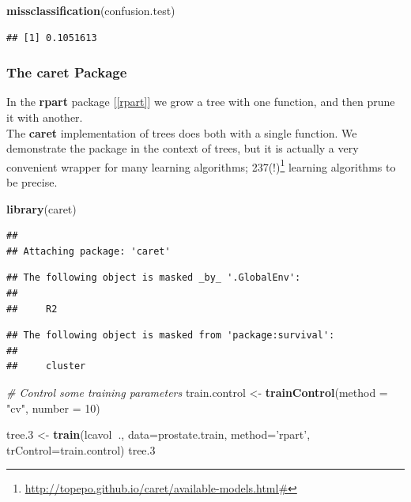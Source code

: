 \documentclass[]{book}
\newenvironment{Shaded}{\begin{snugshade}}{\end{snugshade}}
\newcommand{\CommentTok}[1]{\textcolor[rgb]{0.56,0.35,0.01}{\textit{#1}}}
\newcommand{\DataTypeTok}[1]{\textcolor[rgb]{0.13,0.29,0.53}{#1}}
\newcommand{\DecValTok}[1]{\textcolor[rgb]{0.00,0.00,0.81}{#1}}
\newcommand{\FloatTok}[1]{\textcolor[rgb]{0.00,0.00,0.81}{#1}}
\newcommand{\KeywordTok}[1]{\textcolor[rgb]{0.13,0.29,0.53}{\textbf{#1}}}
\newcommand{\NormalTok}[1]{#1}
\newcommand{\OperatorTok}[1]{\textcolor[rgb]{0.81,0.36,0.00}{\textbf{#1}}}
\newcommand{\StringTok}[1]{\textcolor[rgb]{0.31,0.60,0.02}{#1}}
\renewcommand{\href}[2]{#2\footnote{\url{#1}}}
\theoremstyle{definition}
\theoremstyle{definition}
\theoremstyle{definition}
\theoremstyle{remark}
\begin{document}
\begin{Shaded}
\begin{Highlighting}[]
\KeywordTok{missclassification}\NormalTok{(confusion.test)}
\end{Highlighting}
\end{Shaded}

\begin{verbatim}
## [1] 0.1051613
\end{verbatim}

\hypertarget{caret}{%
\subsubsection{The caret Package}\label{caret}}

In the \textbf{rpart} package {[}\ref{rpart}{]} we grow a tree with one function, and then prune it with another.\\
The \textbf{caret} implementation of trees does both with a single function.
We demonstrate the package in the context of trees, but it is actually a very convenient wrapper for many learning algorithms; \href{http://topepo.github.io/caret/available-models.html\#}{237(!)}
learning algorithms to be precise.

\begin{Shaded}
\begin{Highlighting}[]
\KeywordTok{library}\NormalTok{(caret)}
\end{Highlighting}
\end{Shaded}

\begin{verbatim}
## 
## Attaching package: 'caret'
\end{verbatim}

\begin{verbatim}
## The following object is masked _by_ '.GlobalEnv':
## 
##     R2
\end{verbatim}

\begin{verbatim}
## The following object is masked from 'package:survival':
## 
##     cluster
\end{verbatim}

\begin{Shaded}
\begin{Highlighting}[]
\CommentTok{# Control some training parameters}
\NormalTok{train.control <-}\StringTok{ }\KeywordTok{trainControl}\NormalTok{(}\DataTypeTok{method =} \StringTok{"cv"}\NormalTok{,}
                           \DataTypeTok{number =} \DecValTok{10}\NormalTok{)}

\NormalTok{tree}\FloatTok{.3}\NormalTok{ <-}\StringTok{ }\KeywordTok{train}\NormalTok{(lcavol}\OperatorTok{~}\NormalTok{., }\DataTypeTok{data=}\NormalTok{prostate.train, }
                \DataTypeTok{method=}\StringTok{'rpart'}\NormalTok{, }
                \DataTypeTok{trControl=}\NormalTok{train.control)}
\NormalTok{tree}\FloatTok{.3}
\end{Highlighting}
\end{Shaded}
\end{document}
